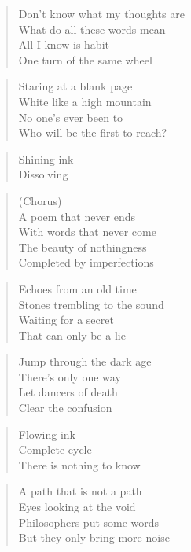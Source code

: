 \phantom{;}
\clearpage



\begin{verse}
Don't know what my thoughts are \\
What do all these words mean \\
All I know is habit \\
One turn of the same wheel
\end{verse}

\begin{verse}
Staring at a blank page \\
White like a high mountain \\
No one's ever been to \\
Who will be the first to reach?
\end{verse}

\begin{verse}
Shining ink \\
Dissolving
\end{verse}

\begin{verse}
(Chorus) \\
A poem that never ends \\
With words that never come \\
The beauty of nothingness \\
Completed by imperfections
\end{verse}

\begin{verse}
Echoes from an old time \\
Stones trembling to the sound \\
Waiting for a secret \\
That can only be a lie
\end{verse}

\begin{verse}
Jump through the dark age \\
There's only one way \\
Let dancers of death \\
Clear the confusion
\end{verse}

\begin{verse}
Flowing ink \\
Complete cycle \\
There is nothing to know
\end{verse}

\begin{verse}
A path that is not a path \\
Eyes looking at the void \\
Philosophers put some words \\
But they only bring more noise
\end{verse}

\clearpage
